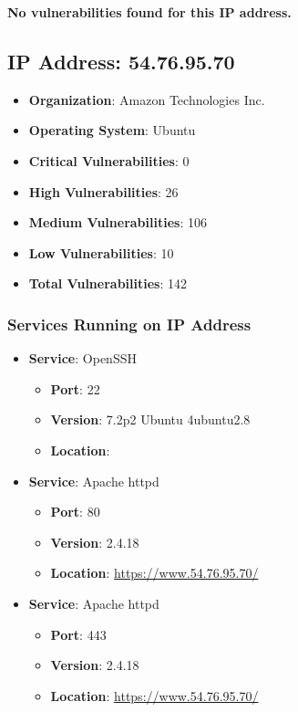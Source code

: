 \documentclass{article}
\begin{document}
\textbf{No vulnerabilities found for this IP address.}




\clearpage



\subsection*{IP Address: 54.76.95.70}

\begin{itemize}
    \item \textbf{Organization}: Amazon Technologies Inc.
    \item \textbf{Operating System}:  Ubuntu 
    \item \textbf{Critical Vulnerabilities}: 0
    \item \textbf{High Vulnerabilities}: 26
    \item \textbf{Medium Vulnerabilities}: 106
    \item \textbf{Low Vulnerabilities}: 10
    \item \textbf{Total Vulnerabilities}: 142
\end{itemize}

\subsubsection*{Services Running on IP Address}

\begin{itemize}
    
        \item \textbf{Service}: OpenSSH
        \begin{itemize}
            \item \textbf{Port}: 22
            \item \textbf{Version}:  7.2p2 Ubuntu 4ubuntu2.8 
            \item \textbf{Location}: \href{  }{  }
        \end{itemize}
    
        \item \textbf{Service}: Apache httpd
        \begin{itemize}
            \item \textbf{Port}: 80
            \item \textbf{Version}:  2.4.18 
            \item \textbf{Location}: \href{ https://www.54.76.95.70/ }{ https://www.54.76.95.70/ }
        \end{itemize}
    
        \item \textbf{Service}: Apache httpd
        \begin{itemize}
            \item \textbf{Port}: 443
            \item \textbf{Version}:  2.4.18 
            \item \textbf{Location}: \href{ https://www.54.76.95.70/ }{ https://www.54.76.95.70/ }
        \end{itemize}
    
\end{itemize}
\end{document}
